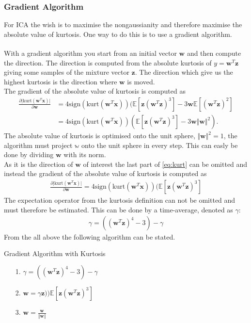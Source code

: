 \subsubsection*{Gradient Algorithm}
For ICA the wish is to maximise the nongaussianity and therefore maximise the absolute value of kurtosis. One way to do this is to use a gradient algorithm.
\\ \\
With a gradient algorithm you start from an initial vector $\mathbf{w}$ and then compute the direction. The direction is computed from the absolute kurtosis of $y = \mathbf{w}^T \mathbf{z}$ giving some samples of the mixture vector $\mathbf{z}$. The direction which give us the highest kurtosis is the direction where $\mathbf{w}$ is moved.
\\
The gradient of the absolute value of kurtosis is computed as
\begin{align}\label{eq:kurt}
\frac{\partial \vert \text{kurt}(\mathbf{w}^T \mathbf{x})\vert}{\partial \mathbf{w}} &= 4 \text{sign}(\text{kurt}(\mathbf{w}^T \mathbf{x})) (\mathbb{E}[\mathbf{z} (\mathbf{w}^T \mathbf{z})^3] - 3 \mathbf{w} \mathbb{E}[(\mathbf{w}^T\mathbf{z})^2] \nonumber \\
&= 4 \text{sign}(\text{kurt}(\mathbf{w}^T \mathbf{x})) (\mathbb{E}[\mathbf{z} (\mathbf{w}^T \mathbf{z})^3] - 3 \mathbf{w} \Vert \mathbf{w} \Vert^2).
\end{align}
The absolute value of kurtosis is optimised onto the unit sphere, $\Vert \mathbf{w} \Vert^2 = 1$, the algorithm must project $\mathbb{w}$ onto the unit sphere in every step. This can easly be done by dividing $\mathbf{w}$ with its norm. 
\\
As it is the direction of $\mathbf{w}$ of interest the last part of 
\eqref{eq:kurt} can be omitted and instead the gradient of the absolute value of kurtosis is computed as
\begin{align*}
\frac{\partial \vert \text{kurt}(\mathbf{w}^T \mathbf{x})\vert}{\partial \mathbf{w}} = 4 \text{sign}(\text{kurt}(\mathbf{w}^T \mathbf{x})) (\mathbb{E}[\mathbf{z} (\mathbf{w}^T \mathbf{z})^3]
\end{align*}
The expectation operator from the kurtosis definition can not be omitted and must therefore be estimated. This can be done by a time-average, denoted as $\gamma$:
\begin{align*}
\gamma = ((\mathbf{w}^T \mathbf{z})^4 - 3) - \gamma
\end{align*}
From the all above the following algorithm can be stated.
\begin{algorithm}[H]
\caption{Gradient Algorithm with Kurtosis}
\begin{itemize}
\item[1.] $\gamma = ((\mathbf{w}^T \mathbf{z})^4 - 3) - \gamma$
\item[2.] $\mathbf{w} = \gamma \mathbf{z})) \mathbb{E}[\mathbf{z} (\mathbf{w}^T \mathbf{z})^3]$
\item[3.] $\mathbf{w} = \frac{\mathbf{w}}{\Vert \mathbf{w} \Vert}$
\end{itemize}
\end{algorithm}

